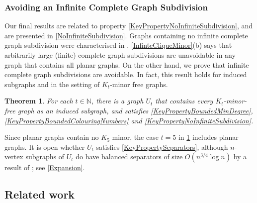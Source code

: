 \documentclass[a4paper,11pt]{article}
\theoremstyle{plain}
\newtheorem{thm}{Theorem}[section]
\theoremstyle{definition}
\renewcommand{\geq}{\geqslant}
\newcommand{\david}[1]{\textcolor{red}{[David: #1]}}
\newcommand{\tony}[1]{\textcolor{orange}{[Tony: #1]}}
\newcommand{\NN}{\mathbb{N}}
\begin{document}
\subsubsection*{Avoiding an Infinite Complete Graph Subdivision}

Our final results are related to property \cref{KeyPropertyNoInfiniteSubdivision}, and are presented in \cref{NoInfiniteSubdivision}. Graphs containing no infinite complete graph subdivision were characterised in \citet{RST-TAMS92}. \cref{InfinteCliqueMinor}(b) says that arbitrarily large (finite) complete graph subdivisions are unavoidable in any graph that contains all planar graphs. On the other hand, we prove that infinite complete graph subdivisions are avoidable. In fact, this result holds for induced subgraphs and in the setting of $K_t$-minor free graphs.

\begin{thm}
\label{Main3} 
For each $t\in\NN$, there is a graph $U_t$ that contains every $K_t$-minor-free graph as an induced subgraph, and satisfies 
\cref{KeyPropertyBoundedMinDegree}, \cref{KeyPropertyBoundedColouringNumbers}
and \cref{KeyPropertyNoInfiniteSubdivision}.
\end{thm}

Since planar graphs contain no $K_5$ minor, the case $t=5$ in \cref{Main3} includes planar graphs. It is open whether $U_t$ satisfies \cref{KeyPropertySeparators}, although $n$-vertex subgraphs of $U_t$ do have balanced separators of size $O(n^{3/4}\log n)$ by a result of \citet{PRS94}; see \cref{Expansion}. 



\subsection{Related work}
\label{Related}

\end{document}
